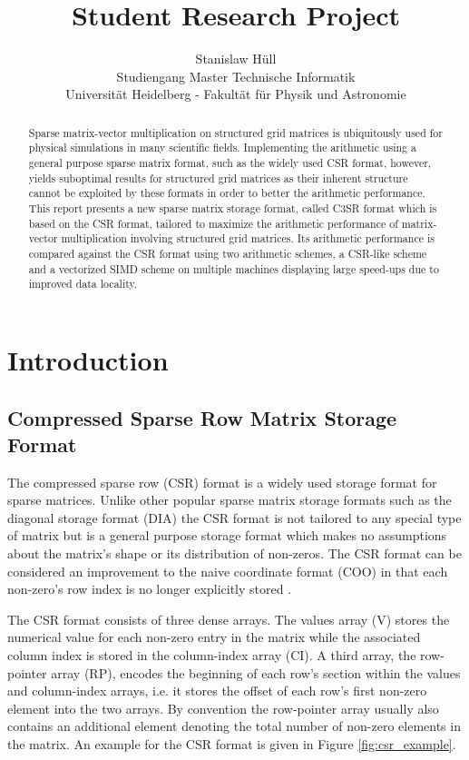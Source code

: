 \documentclass{article}
\author{Stanislaw Hüll\\\small{Studiengang Master Technische Informatik}\\\small{Universität Heidelberg - Fakultät für Physik und Astronomie}}
\title{Student Research Project}
\begin{document}
\maketitle

\begin{abstract}
Sparse matrix-vector multiplication on structured grid matrices is ubiquitously used for physical simulations in many scientific fields. Implementing the arithmetic using a general purpose sparse matrix format, such as the widely used CSR format, however, yields suboptimal results for structured grid matrices as their inherent structure cannot be exploited by these formats in order to better the arithmetic performance. This report presents a new sparse matrix storage format, called C3SR format which is based on the CSR format, tailored to maximize the arithmetic performance of matrix-vector multiplication involving structured grid matrices. Its arithmetic performance is compared against the CSR format using two arithmetic schemes, a CSR-like scheme and a vectorized SIMD scheme on multiple machines displaying large speed-ups due to improved data locality.
\end{abstract}

\newpage
\tableofcontents
\newpage
\listoffigures
\newpage
\section{Introduction}

  \subsection{Compressed Sparse Row Matrix Storage Format}

    The compressed sparse row (CSR) format is a widely used storage format for sparse matrices. Unlike other popular sparse matrix storage formats such as the diagonal storage format (DIA) the CSR format is not tailored to any special type of matrix but is a general purpose storage format which makes no assumptions about the matrix's shape or its distribution of non-zeros. The CSR format can be considered an improvement to the naive coordinate format (COO) in that each non-zero's row index is no longer explicitly stored \cite{Bell2011}.

    The CSR format consists of three dense arrays. The values array (V) stores the numerical value for each non-zero entry in the matrix while the associated column index is stored in the column-index array (CI). A third array, the row-pointer array (RP), encodes the beginning of each row's section within the values and column-index arrays, i.e. it stores the offset of each row's first non-zero element into the two arrays. By convention the row-pointer array usually also contains an additional element denoting the total number of non-zero elements in the matrix. An example for the CSR format is given in Figure \ref{fig:csr_example}.
\end{document}
